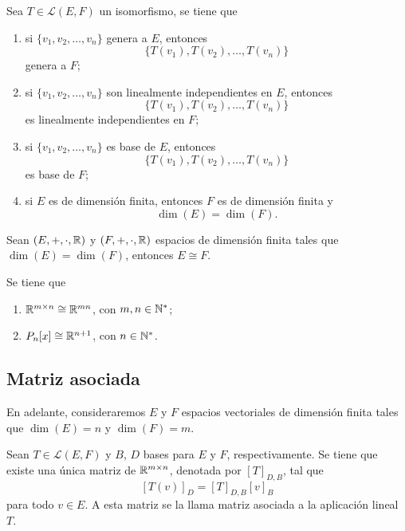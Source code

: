 \documentclass[a4,11pt]{aleph-notas}
\begin{document}
\begin{teo}
    Sea $T \in \mathcal{L}(E,F)$ un isomorfismo, se tiene que
    \begin{enumerate}
    \item 
        si $\{v_1, v_2, \ldots, v_n\}$ genera a $E$, entonces 
        \[
            \{T(v_1), T(v_2), \ldots, T(v_n)\}
        \]
        genera a $F$;
    \item 
        si $\{v_1, v_2, \ldots, v_n\}$ son linealmente independientes en $E$, entonces 
        \[
            \{T(v_1), T(v_2), \ldots, T(v_n)\}
        \] 
        es linealmente independientes en $F$;
    \item 
        si $\{v_1, v_2, \ldots, v_n\}$ es base de $E$, entonces
        \[
            \{T(v_1), T(v_2), \ldots, T(v_n)\}
        \]
        es base de $F$; 
    \item 
        si $E$ es de dimensión finita, entonces $F$ es de dimensión finita y 
        \[
            \dim(E) = \dim(F).
        \]
    \end{enumerate}
\end{teo} 

\begin{teo}
    Sean $(E,+,\cdot,\R)$ y $(F,+,\cdot,\R)$ espacios de dimensión finita tales que $\dim(E) = \dim(F)$, entonces $E \cong F$.
\end{teo}

\begin{teo}
    Se tiene que
    \begin{enumerate}
        \item $\Mat{m}{n} \cong \R^{mn}$, con $m,n\in\N^*$;
        \item $P_n[x] \cong \R^{n+1}$, con $n\in\N^*$.
    \end{enumerate}
\end{teo}


\subsection{Matriz asociada}

En adelante, consideraremos $E$ y $F$ espacios vectoriales de dimensión finita tales que $\dim(E)=n$ y $\dim(F)=m$.

\begin{defi}
    Sean $T \in \mathcal{L}(E,F)$ y $B$, $D$ bases para $E$ y $F$, respectivamente. Se tiene que existe una única matriz de $\Mat[\R]{m}{n}$, denotada por $[T]_{D,B}$, tal que
    \[
        [T(v)]_{D} = [T]_{D,B} [v]_{B}
    \]
    para todo $v\in E$. A esta matriz se la llama matriz asociada a la aplicación lineal $T$.
\end{defi}
\end{document}
